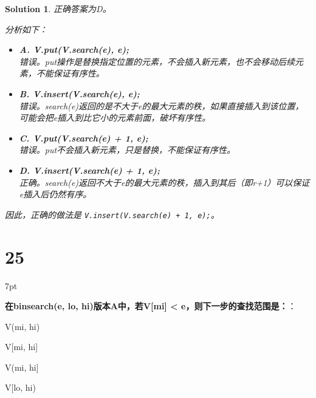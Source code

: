 \documentclass[UTF8]{report}
\newtheorem{solution}{Solution}
\theoremstyle{MyLineTheoremStyle} %
\theoremstyle{MyBlockTheoremStyle} %
\theoremstyle{MySubsubsectionStyle} %
\newenvironment{graybox}{%
        \def\FrameCommand{%
        \hspace{1pt}%
        {\color{gray}\small \vrule width 2pt}%
        {\color{graybox_color}\vrule width 4pt}%
        \colorbox{graybox_color}%
        }%
        \MakeFramed{\advance\hsize-\width\FrameRestore}%
        \noindent\hspace{-4.55pt}%
        \begin{adjustwidth}{}{7pt}%
        \vspace{2pt}\vspace{2pt}%
        }
        {%
        \vspace{2pt}\end{adjustwidth}\endMakeFramed%
        }
\begin{document}
\begin{solution}
正确答案为D。

分析如下：

\begin{itemize}
    \item \textbf{A. V.put(V.search(e), e);} \\
    错误。put操作是替换指定位置的元素，不会插入新元素，也不会移动后续元素，不能保证有序性。

    \item \textbf{B. V.insert(V.search(e), e);} \\
    错误。search(e)返回的是不大于e的最大元素的秩，如果直接插入到该位置，可能会把e插入到比它小的元素前面，破坏有序性。

    \item \textbf{C. V.put(V.search(e) + 1, e);} \\
    错误。put不会插入新元素，只是替换，不能保证有序性。

    \item \textbf{D. V.insert(V.search(e) + 1, e);} \\
    正确。search(e)返回不大于e的最大元素的秩，插入到其后（即r+1）可以保证e插入后仍然有序。
\end{itemize}

因此，正确的做法是 \texttt{V.insert(V.search(e) + 1, e);}。
\end{solution}


\section*{25}

\begin{graybox}
\textbf{在binsearch(e, lo, hi)版本A中，若V[mi] < e，则下一步的查找范围是：}：
\begin{circledenum}
    \item V(mi, hi)
    \item V[mi, hi]
    \item V(mi, hi]
    \item V[lo, hi)
\end{circledenum}
\end{graybox}
\end{document}
